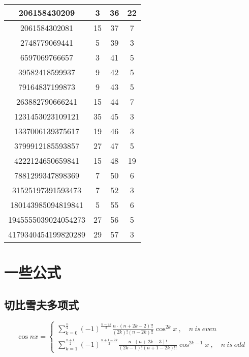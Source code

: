 \begin{table}[!htbp]
\begin{tabular}{|c|c|c|c|}
206158430209        & 3   & 36 & 22    \\ \hline
2061584302081       & 15  & 37 & 7     \\ \hline
2748779069441       & 5   & 39 & 3     \\ \hline
6597069766657       & 3   & 41 & 5     \\ \hline
39582418599937      & 9   & 42 & 5     \\ \hline
79164837199873      & 9   & 43 & 5     \\ \hline
263882790666241     & 15  & 44 & 7     \\ \hline
1231453023109121    & 35  & 45 & 3     \\ \hline
1337006139375617    & 19  & 46 & 3     \\ \hline
3799912185593857    & 27  & 47 & 5     \\ \hline
4222124650659841    & 15  & 48 & 19    \\ \hline
7881299347898369    & 7   & 50 & 6     \\ \hline
31525197391593473   & 7   & 52 & 3     \\ \hline
180143985094819841  & 5   & 55 & 6     \\ \hline
1945555039024054273 & 27  & 56 & 5     \\ \hline
4179340454199820289 & 29  & 57 & 3     \\ \hline
\end{tabular}
\end{table}

\section{一些公式}
\subsection{切比雪夫多项式}
$$
\cos n x=\left\{\begin{array}{l}{\sum_{k=0}^{\frac{n}{2}}(-1)^{\frac{n-2 k}{2}} \frac{n \cdot(n+2 k-2) ! !}{(2 k) !(n-2 k) ! !} \cos ^{2 k} x} \ , \quad  n\ is\ even \\
 {\sum_{k=1}^{\frac{n+1}{2}}(-1)^{\frac{n+1-2 k}{2}} \frac{n \cdot(n+2 k-3) !}{(2 k-1) !(n+1-2 k) ! !} \cos ^{2 k-1} x} \ , \quad  n\ is\ odd  \end{array}\right.
$$
